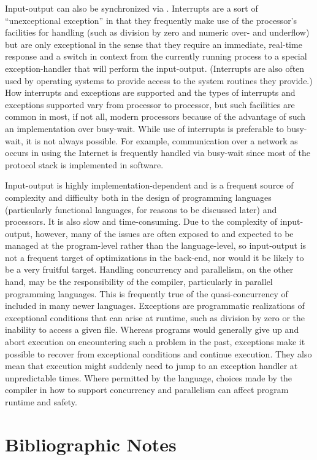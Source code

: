Input-output can also be synchronized via . Interrupts are a sort of ``unexceptional exception'' in that they frequently make use of the processor's facilities for handling  (such as division by zero and numeric over- and underflow) but are only exceptional in the sense that they require an immediate, real-time response and a switch in context from the currently running process to a special exception-handler that will perform the input-output. (Interrupts are also often used by operating systems to provide access to the system routines they provide.) How interrupts and exceptions are supported and the types of interrupts and exceptions supported vary from processor to processor, but such facilities are common in most, if not all, modern processors because of the advantage of such an implementation over busy-wait. While use of interrupts is preferable to busy-wait, it is not always possible. For example, communication over a network as occurs in using the Internet is frequently handled via busy-wait since most of the protocol stack is implemented in software.

Input-output is highly implementation-dependent and is a frequent source of complexity and difficulty both in the design of programming languages (particularly functional languages, for reasons to be discussed later) and processors. %
It is also slow and time-consuming. Due to the complexity of input-output, however, many of the issues are often exposed to and expected to be managed at the program-level rather than the language-level, so input-output is not a frequent target of optimizations in the back-end, nor would it be likely to be a very fruitful target. Handling concurrency and parallelism, on the other hand, may be the responsibility of the compiler, particularly in parallel programming languages. This is frequently true of the quasi-concurrency of  included in many newer languages. Exceptions are programmatic realizations of exceptional conditions that can arise at runtime, such as division by zero or the inability to access a given file. Whereas programs would generally give up and abort execution on encountering such a problem in the past, exceptions make it possible to recover from exceptional conditions and continue execution. They also mean that execution might suddenly need to jump to an exception handler at unpredictable times. Where permitted by the language, choices made by the compiler in how to support concurrency and parallelism can affect program runtime and safety.

\section{Bibliographic Notes}\label{background:computers:bibliographicnotes}